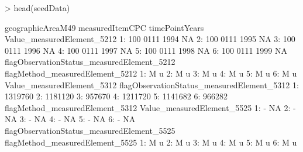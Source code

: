 \documentclass[nojss]{jss}
\begin{document}
\begin{Schunk}
\begin{Sinput}
> head(seedData)
\end{Sinput}
\begin{Soutput}
   geographicAreaM49 measuredItemCPC timePointYears Value_measuredElement_5212
1:               100            0111           1994                         NA
2:               100            0111           1995                         NA
3:               100            0111           1996                         NA
4:               100            0111           1997                         NA
5:               100            0111           1998                         NA
6:               100            0111           1999                         NA
   flagObservationStatus_measuredElement_5212 flagMethod_measuredElement_5212
1:                                          M                               u
2:                                          M                               u
3:                                          M                               u
4:                                          M                               u
5:                                          M                               u
6:                                          M                               u
   Value_measuredElement_5312 flagObservationStatus_measuredElement_5312
1:                    1319760                                           
2:                    1181120                                           
3:                     957670                                           
4:                    1211720                                           
5:                    1141682                                           
6:                     966282                                           
   flagMethod_measuredElement_5312 Value_measuredElement_5525
1:                               -                         NA
2:                               -                         NA
3:                               -                         NA
4:                               -                         NA
5:                               -                         NA
6:                               -                         NA
   flagObservationStatus_measuredElement_5525 flagMethod_measuredElement_5525
1:                                          M                               u
2:                                          M                               u
3:                                          M                               u
4:                                          M                               u
5:                                          M                               u
6:                                          M                               u
\end{Soutput}
\end{Schunk}
\end{document}
